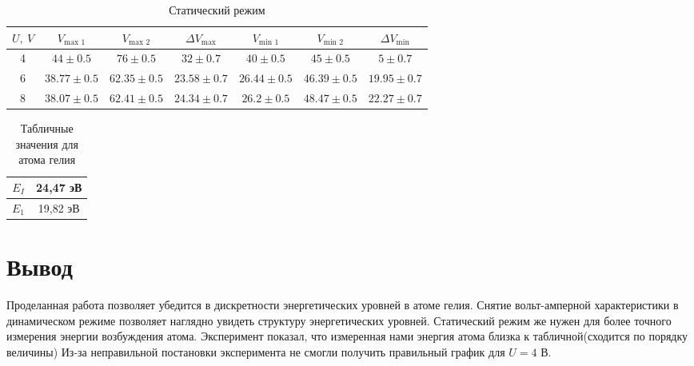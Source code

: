 \documentclass[a4paper, 12pt]{article}
\begin{document}
	\begin{table}[!htb]
		\caption{Статический режим}
		\centering
		\begin{tabular}{|c|c|c|c|c|c|c|}
			\hline
			$U,\ V$ & $V_{\text{max 1}}$ & $V_{\text{max 2}}$ & $\Delta V_{\text{max}}$ & $V_{\text{min 1}}$ & $V_{\text{min 2}}$ & $\Delta V_{\text{min}}$\\
			\hline
			4 & $44 \pm 0.5$ & $76 \pm 0.5$ & $32 \pm 0.7$ & $40 \pm 0.5$ & $45 \pm 0.5$ & $5 \pm 0.7$ \\
		 	6 & $38.77 \pm 0.5$ & $62.35 \pm 0.5$ & $23.58 \pm 0.7$ & $26.44 \pm 0.5$ & $46.39 \pm 0.5$ & $19.95 \pm 0.7$ \\
 			8 & $38.07 \pm 0.5$ & $62.41 \pm 0.5$ & $24.34 \pm 0.7$ & $26.2 \pm 0.5$ & $48.47 \pm 0.5$ & $22.27 \pm 0.7$ \\
 			\hline
		\end{tabular}
	\end{table}
	\begin{table}[h!]
			\centering
			\caption{Табличные значения для атома гелия}
			\label{table3}
			\begin{tabular}{|c|c|}
				\hline
				$E_I$                                  & 24,47 эВ \\ \hline
				$E_1$ & 19,82 эВ \\ \hline
			\end{tabular}
		\end{table}
	\section{Вывод}
	Проделанная работа позволяет убедится в дискретности энергетических уровней в атоме гелия. Снятие вольт-амперной характеристики в динамическом режиме позволяет наглядно увидеть структуру энергетических уровней. Статический режим же нужен для более точного измерения энергии возбуждения атома. Эксперимент показал, что измеренная нами энергия атома близка к табличной(сходится по порядку величины) Из-за неправильной постановки эксперимента не смогли получить правильный график для $U=4$ В.
\end{document}
